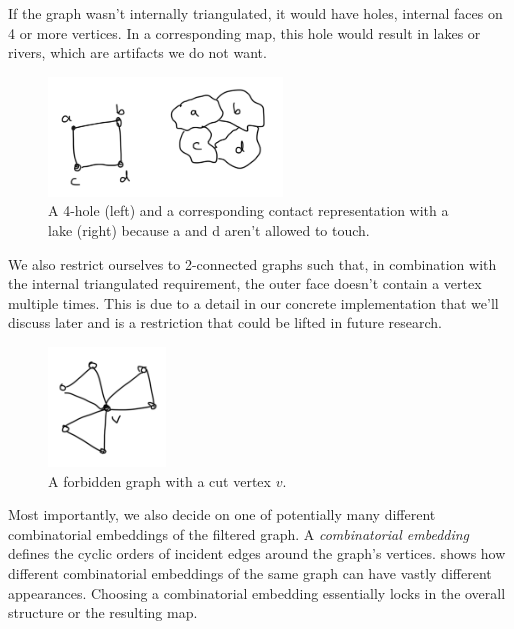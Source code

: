 If the graph wasn't internally triangulated, it would have holes, \ie{} internal faces on 4 or more vertices. In a corresponding map, this hole would result in lakes or rivers, which are artifacts we do not want.

\begin{figure}[H]
	\centering\includegraphics[height=120px]{Resources/Filtering-Hole.png}
	\caption{A 4-hole (left) and a corresponding contact representation with a lake (right) because a and d aren't allowed to touch.}
	\label{fig:filtering-holes}
\end{figure}

We also restrict ourselves to 2-connected graphs such that, in combination with the internal triangulated requirement, the outer face doesn't contain a vertex multiple times. This is due to a detail in our concrete implementation that we'll discuss later and is a restriction that could be lifted in future research.

\begin{figure}[H]
	\centering\includegraphics[height=120px]{Resources/Filtering-Connectedness.png}
	\caption{A forbidden graph with a cut vertex $v$.}
	\label{fig:filtering-connectedness}
\end{figure}

Most importantly, we also decide on one of potentially many different combinatorial embeddings of the filtered graph. A \emph{combinatorial embedding} defines the cyclic orders of incident edges around the graph's vertices.  shows how different combinatorial embeddings of the same graph can have vastly different appearances. Choosing a  combinatorial embedding essentially locks in the overall structure or the resulting map.

